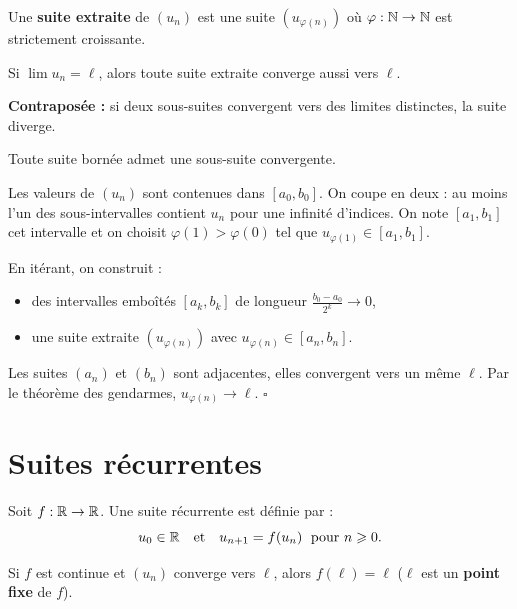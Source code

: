 \begin{defbox}
Une \textbf{suite extraite} de $(u_n)$ est une suite $(u_{\varphi(n)})$ où $\varphi : \mathbb{N} \to \mathbb{N}$ est strictement croissante.
\end{defbox}

\begin{propbox}
Si $\lim u_n = \ell$, alors toute suite extraite converge aussi vers $\ell$.

\textbf{Contraposée :} si deux sous-suites convergent vers des limites distinctes, la suite diverge.
\end{propbox}

\begin{thmbox}
Toute suite bornée admet une sous-suite convergente.
\end{thmbox}

\begin{proofbox}
Les valeurs de $(u_n)$ sont contenues dans $[a_0, b_0]$. On coupe en deux : au moins l'un des sous-intervalles contient $u_n$ pour une infinité d'indices. On note $[a_1, b_1]$ cet intervalle et on choisit $\varphi(1) > \varphi(0)$ tel que $u_{\varphi(1)} \in [a_1, b_1]$.

En itérant, on construit :
\begin{itemize}[leftmargin=1cm]
  \item des intervalles emboîtés $[a_k, b_k]$ de longueur $\frac{b_0 - a_0}{2^k} \to 0$,
  \item une suite extraite $(u_{\varphi(n)})$ avec $u_{\varphi(n)} \in [a_n, b_n]$.
\end{itemize}
Les suites $(a_n)$ et $(b_n)$ sont adjacentes, elles convergent vers un même $\ell$. Par le théorème des gendarmes, $u_{\varphi(n)} \to \ell$. \hfill$\square$
\end{proofbox}


\section{Suites récurrentes}

\begin{defbox}
Soit $f : \mathbb{R} \to \mathbb{R}$. Une suite récurrente est définie par :
\[
  u_0 \in \mathbb{R} \quad \text{et} \quad u_{n+1} = f(u_n) \;\text{ pour } n \geqslant 0.
\]
\end{defbox}

\begin{propbox}
Si $f$ est continue et $(u_n)$ converge vers $\ell$, alors $f(\ell) = \ell$ \quad ($\ell$ est un \textbf{point fixe} de $f$).
\end{propbox}


